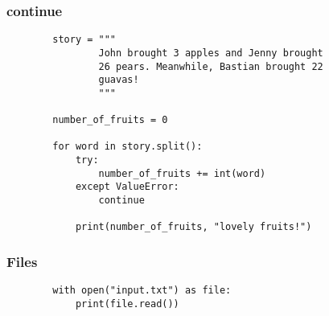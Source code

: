 \documentclass[notes]{beamer}
\begin{document}
	\begin{frame}[fragile]
		\frametitle{continue}
		\begin{lstlisting}
		story = """
		        John brought 3 apples and Jenny brought
		        26 pears. Meanwhile, Bastian brought 22
		        guavas!
		        """

		number_of_fruits = 0
		
		for word in story.split():
		    try:
		        number_of_fruits += int(word)
		    except ValueError:
		        continue
		
		    print(number_of_fruits, "lovely fruits!")
		\end{lstlisting}
	\end{frame}
	
	\begin{frame}[fragile]
		\frametitle{Files}
		
		\begin{lstlisting}
		with open("input.txt") as file:
		    print(file.read())
		\end{lstlisting}
	\end{frame}
\end{document}
